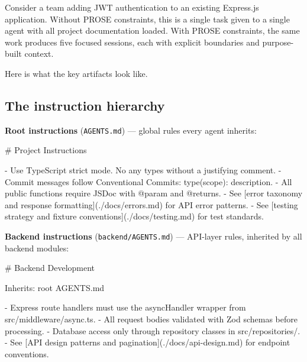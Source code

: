 \documentclass[
  a4paper,
  DIV=11,
  numbers=noendperiod]{scrreprt}
\newenvironment{Shaded}{\begin{snugshade}}{\end{snugshade}}
\newcommand{\CommentTok}[1]{\textcolor[rgb]{0.37,0.37,0.37}{#1}}
\newcommand{\FunctionTok}[1]{\textcolor[rgb]{0.28,0.35,0.67}{#1}}
\newcommand{\InformationTok}[1]{\textcolor[rgb]{0.37,0.37,0.37}{#1}}
\newcommand{\NormalTok}[1]{\textcolor[rgb]{0.00,0.23,0.31}{#1}}
\newcommand{\OtherTok}[1]{\textcolor[rgb]{0.00,0.23,0.31}{#1}}
\newcommand{\SpecialStringTok}[1]{\textcolor[rgb]{0.13,0.47,0.30}{#1}}
\begin{document}
Consider a team adding JWT authentication to an existing Express.js
application. Without PROSE constraints, this is a single task given to a
single agent with all project documentation loaded. With PROSE
constraints, the same work produces five focused sessions, each with
explicit boundaries and purpose-built context.

Here is what the key artifacts look like.

\subsection{The instruction hierarchy}\label{the-instruction-hierarchy}

\textbf{Root instructions} (\texttt{AGENTS.md}) --- global rules every
agent inherits:

\begin{Shaded}
\begin{Highlighting}[]
\FunctionTok{\# Project Instructions}

\SpecialStringTok{{-} }\NormalTok{Use TypeScript strict mode. No }\InformationTok{\textasciigrave{}any\textasciigrave{}}\NormalTok{ types without a justifying comment.}
\SpecialStringTok{{-} }\NormalTok{Commit messages follow Conventional Commits: }\InformationTok{\textasciigrave{}type(scope): description\textasciigrave{}}\NormalTok{.}
\SpecialStringTok{{-} }\NormalTok{All public functions require JSDoc with }\InformationTok{\textasciigrave{}@param\textasciigrave{}}\NormalTok{ and }\InformationTok{\textasciigrave{}@returns\textasciigrave{}}\NormalTok{.}
\SpecialStringTok{{-} }\NormalTok{See }\CommentTok{[}\OtherTok{error taxonomy and response formatting}\CommentTok{](./docs/errors.md)}\NormalTok{ for API error patterns.}
\SpecialStringTok{{-} }\NormalTok{See }\CommentTok{[}\OtherTok{testing strategy and fixture conventions}\CommentTok{](./docs/testing.md)}\NormalTok{ for test standards.}
\end{Highlighting}
\end{Shaded}

\textbf{Backend instructions} (\texttt{backend/AGENTS.md}) --- API-layer
rules, inherited by all backend modules:

\begin{Shaded}
\begin{Highlighting}[]
\FunctionTok{\# Backend Development}

\NormalTok{Inherits: root AGENTS.md}

\SpecialStringTok{{-} }\NormalTok{Express route handlers must use the }\InformationTok{\textasciigrave{}asyncHandler\textasciigrave{}}\NormalTok{ wrapper from }\InformationTok{\textasciigrave{}src/middleware/async.ts\textasciigrave{}}\NormalTok{.}
\SpecialStringTok{{-} }\NormalTok{All request bodies validated with Zod schemas before processing.}
\SpecialStringTok{{-} }\NormalTok{Database access only through repository classes in }\InformationTok{\textasciigrave{}src/repositories/\textasciigrave{}}\NormalTok{.}
\SpecialStringTok{{-} }\NormalTok{See }\CommentTok{[}\OtherTok{API design patterns and pagination}\CommentTok{](./docs/api{-}design.md)}\NormalTok{ for endpoint conventions.}
\end{Highlighting}
\end{Shaded}
\end{document}
